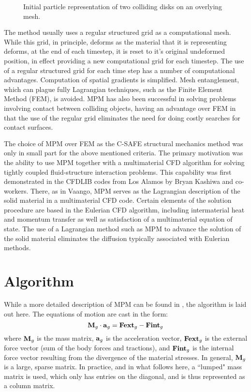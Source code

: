 \begin{figure}[h]
  \centering
  \caption{\label{fig-disks_init} Initial particle representation of two
                                colliding disks on an overlying mesh.}
\end{figure}

The method usually uses a regular structured grid as a 
computational mesh.
While this grid, in principle, deforms as the material that it 
is representing
deforms, at the end of each timestep, it is reset to it's 
original undeformed
position, in effect providing a new computational grid for each 
timestep.
The use of a regular structured grid for each time step has a 
number of
computational advantages.  Computation of spatial gradients is 
simplified.
Mesh entanglement, which can plague fully Lagrangian techniques, 
such as
the Finite Element Method (FEM), is avoided.  MPM has also been 
successful
in solving problems involving contact between colliding objects, 
having an
advantage over FEM in that the use of the regular grid 
eliminates the
need for doing costly searches for contact surfaces\cite{bard}.

The choice of MPM over FEM as the C-SAFE structural mechanics method
was only in small part for the above mentioned criteria.  The
primary motivation was the ability to use MPM together with a multimaterial
CFD algorithm for solving tightly coupled fluid-structure interaction
problems.  This capability was first demonstrated in the CFDLIB
codes from Los Alamos by Bryan Kashiwa and co-workers.  There, as
in Vaango, MPM serves as the Lagrangian description of the solid
material in a multimaterial CFD code.  Certain elements of the
solution procedure are based in the Eulerian CFD algorithm, including
intermaterial heat and momentum transfer as well as satisfaction
of a multimaterial equation of state.  The use of a Lagrangian method
such as MPM to advance the solution of the solid material eliminates
the diffusion typically associated with Eulerian methods.

\section{Algorithm}

While a more detailed description of MPM can be found in 
\cite{sulskycpc},
the algorithm is laid out here.  The equations of motion are 
cast in the
form:
\begin{equation}
	\mbox{\ensuremath{\mathbf{M}}}_g \cdot \mbox{\ensuremath{\mathbf{a}}}_g = \mbox{\ensuremath{\mathbf{Fext}}}_g - \mbox{\ensuremath{\mathbf{Fint}}}_g  
\label{newton2}
\end{equation}
where $\mbox{\ensuremath{\mathbf{M}}}_g$ is the mass matrix, $\mbox{\ensuremath{\mathbf{a}}}_g$ is the 
acceleration vector,
$\mbox{\ensuremath{\mathbf{Fext}}}_g$ is the external force vector (sum of the body 
forces and
tractions), and $\mbox{\ensuremath{\mathbf{Fint}}}_g$ is the internal force vector 
resulting from
the divergence of the material stresses.  In general, $\mbox{\ensuremath{\mathbf{M}}}_g$ 
is a 
large, sparse matrix.  In practice, and in what follows here, a 
``lumped"
mass matrix is used, which only has entries on the diagonal, and 
is thus
represented as a column matrix.

